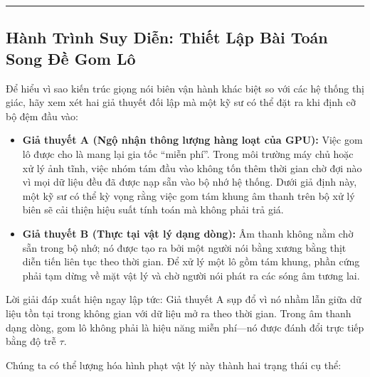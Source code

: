 \documentclass[11pt,a4paper]{article}
\begin{document}
\medskip
\hrule
\medskip

\subsection*{Hành Trình Suy Diễn: Thiết Lập Bài Toán Song Đề Gom Lô}

Để hiểu vì sao kiến trúc giọng nói biên vận hành khác biệt so với các hệ thống thị giác, hãy xem xét hai giả thuyết đối lập mà một kỹ sư có thể đặt ra khi định cỡ bộ đệm đầu vào:

\begin{itemize}\setlength{\itemsep}{2pt}\setlength{\parskip}{0pt}
    \item \textbf{Giả thuyết A (Ngộ nhận thông lượng hàng loạt của GPU):} Việc gom lô được cho là mang lại gia tốc ``miễn phí''. Trong môi trường máy chủ hoặc xử lý ảnh tĩnh, việc nhóm tám đầu vào không tốn thêm thời gian chờ đợi nào vì mọi dữ liệu đều đã được nạp sẵn vào bộ nhớ hệ thống. Dưới giả định này, một kỹ sư có thể kỳ vọng rằng việc gom tám khung âm thanh trên bộ xử lý biên sẽ cải thiện hiệu suất tính toán mà không phải trả giá.
    \item \textbf{Giả thuyết B (Thực tại vật lý dạng dòng):} Âm thanh không nằm chờ sẵn trong bộ nhớ; nó được tạo ra bởi một người nói bằng xương bằng thịt diễn tiến liên tục theo thời gian. Để xử lý một lô gồm tám khung, phần cứng phải tạm dừng về mặt vật lý và chờ người nói phát ra các sóng âm tương lai.
\end{itemize}

Lời giải đáp xuất hiện ngay lập tức: Giả thuyết A sụp đổ vì nó nhầm lẫn giữa dữ liệu tồn tại trong không gian với dữ liệu mở ra theo thời gian. Trong âm thanh dạng dòng, gom lô không phải là hiệu năng miễn phí---nó được đánh đổi trực tiếp bằng độ trễ $\tau$.

Chúng ta có thể lượng hóa hình phạt vật lý này thành hai trạng thái cụ thể:
\end{document}
